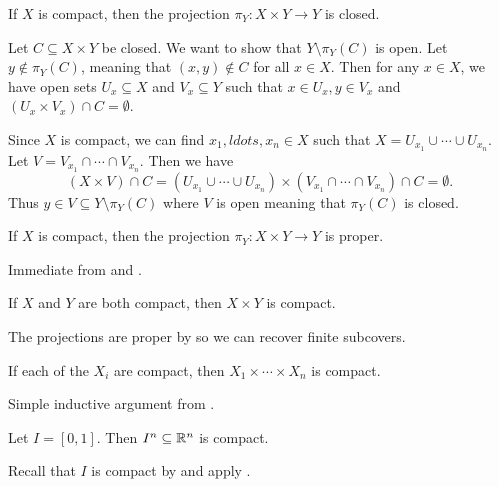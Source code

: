 \documentclass[letterpaper, 11pt, oneside]{book}
\begin{document}
\begin{prop}\label{prop: compact_proj_closed}
  If $X$ is compact, then the projection $\pi_{Y}\colon X \times Y \to Y$ is closed.
\end{prop}
\begin{pf}
  Let $C \subseteq X \times Y$ be closed.
  We want to show that $Y \setminus \pi_{Y}(C)$ is open.
  Let $y \notin \pi_{Y}(C)$, meaning that $(x, y) \notin C$ for all $x \in X$.
  Then for any $x \in X$, we have open sets $U_{x} \subseteq X$ and $V_{x} \subseteq Y$ such that $x \in U_{x}, y \in V_{x}$ and $(U_{x} \times V_{x}) \cap C = \emptyset$.

  Since $X$ is compact, we can find $x_{1}, ldots, x_{n} \in X$ such that $X = U_{x_{1}} \cup \cdots \cup U_{x_{n}}$.
  Let $V = V_{x_{1}} \cap \cdots \cap V_{x_{n}}$.
  Then we have
  \[
    (X \times V) \cap C = ( U_{x_{1}} \cup \cdots \cup U_{x_{n}} ) \times ( V_{x_{1}} \cap \cdots \cap V_{x_{n}} ) \cap C = \emptyset.
  \]
  Thus $y \in V \subseteq Y \setminus \pi_{Y}(C)$ where $V$ is open meaning that $\pi_{Y}(C)$ is closed.
\end{pf}

\begin{cor}\label{cor: compact_projection_proper}
  If $X$ is compact, then the projection $\pi_{Y}\colon X \times Y \to Y$ is proper.
\end{cor}
\begin{pf}
  Immediate from  and .
\end{pf}

\begin{cor}\label{cor: prod_of_compact_is_compact}
  If $X$ and $Y$ are both compact, then $X \times Y$ is compact.
\end{cor}
\begin{pf}
  The projections are proper by  so we can recover finite subcovers.
\end{pf}

\begin{cor}\label{cor: tychonoff_finite}
  If each of the $X_{i}$ are compact, then $X_{1} \times \cdots \times X_{n}$ is compact.
\end{cor}
\begin{pf}
  Simple inductive argument from .
\end{pf}

\begin{cor}\label{cor: I^n_compact}
  Let $I = [0, 1]$.
  Then $I^{n} \subseteq \mathbb{R}^{n}$ is compact.
\end{cor}
\begin{pf}
  Recall that $I$ is compact by  and apply .
\end{pf}
\end{document}

